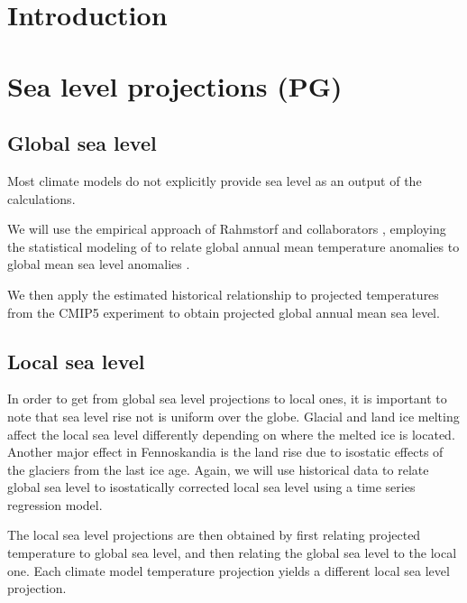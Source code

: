 \documentclass[wrr, draft]{agutex}
\begin{document}
\begin{article}



\section{Introduction}\label{sec:intro}

\section{Sea level projections {\color{blue} (PG)}}



\subsection{Global sea level}
Most climate models do not explicitly provide sea level as an output of the calculations. 

We will use the empirical approach of Rahmstorf and collaborators \citep{Rahmstorf07,Rahmstorf11}, employing the statistical modeling of \citet{Bolin2014a} to relate global annual mean temperature anomalies \citep{giss} to global mean sea level anomalies \citep{csiro}. 


We then apply the estimated historical relationship to projected temperatures from the CMIP5 experiment \citep{cmip5} to obtain projected global annual mean sea level. 


\subsection{Local sea level}
In order to get from global sea level projections to local ones, it is important to note that sea level rise not is uniform over the globe. Glacial and land ice melting affect the local sea level differently depending on where the melted ice is located.
Another major effect in Fennoskandia is the land rise due to isostatic effects of the glaciers from the last ice age.
Again, we will use historical data to relate global sea level to isostatically corrected local sea level using a time series regression model. 

The local sea level projections are then obtained by first relating projected temperature to global sea level, and then relating the global sea level to the local one. Each climate model temperature projection yields a different local sea level projection.


\end{article}
\end{document}
